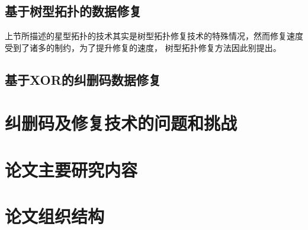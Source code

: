 \subsection{基于树型拓扑的数据修复}
上节所描述的星型拓扑的技术其实是树型拓扑修复技术的特殊情况，然而修复速度受到了诸多的制约，为了提升修复的速度，
树型拓扑修复方法因此别提出。


\subsection{基于XOR的纠删码数据修复}

\section{纠删码及修复技术的问题和挑战}

\section{论文主要研究内容}

\section{论文组织结构}







